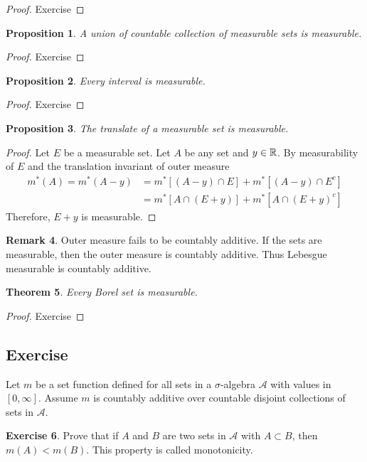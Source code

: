 \documentclass[	DIV=calc,paper=a4,fontsize=11pt]{scrartcl}	 	%
\newtheorem{thm}{Theorem}[section]
\newtheorem{prop}[thm]{Proposition}
\theoremstyle{definition}
\newtheorem{exer}[thm]{Exercise}
\newtheorem{rem}[thm]{Remark}
\theoremstyle{plain}
\theoremstyle{remark}
\begin{document}
\begin{proof}
Exercise
\end{proof}

\begin{prop}
A union of countable collection of measurable sets is measurable.
\end{prop}

\begin{proof}
Exercise
\end{proof}


\begin{prop}
Every interval is measurable.
\end{prop}

\begin{proof}
Exercise
\end{proof}

\begin{prop}
The translate of a measurable set is measurable.
\end{prop}

\begin{proof}
Let $E$ be a measurable set. Let $A$ be any set and $y\in \Bbb R$. By measurability of $E$ and the translation invariant of outer measure
\begin{align*}
m^*(A)=m^*(A-y)&=m^*[(A-y)\cap E]+m^*[(A-y)\cap E^c]\\
               &=m^*[A\cap (E+y)]+m^*[A\cap (E+y)^c]
\end{align*}
Therefore, $E+y$ is measurable.
\end{proof}

\begin{rem}\color{red}
Outer measure fails to be countably additive. If the sets are measurable, then the outer measure is countably additive. Thus Lebesgue measurable is countably additive.
\end{rem}

\begin{thm}
Every Borel set is measurable.
\end{thm}

\begin{proof}
Exercise
\end{proof}

\newpage
\subsection{Exercise}
Let $m$ be a set function defined for all sets in a $\sigma$-algebra $\mathcal{A}$ with values in $[0,\infty]$. Assume $m$ is countably additive over countable disjoint collections of sets in $\mathcal{A}$.
\begin{exer}\label{081}
Prove that if $A$ and $B$ are two sets in $\mathcal{A}$ with $A\subset B$, then $m(A)< m(B)$. This property is
called monotonicity.
\end{exer}
\end{document}
